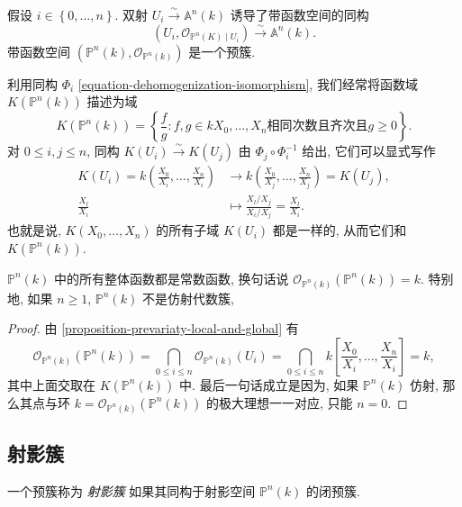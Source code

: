 \begin{corollary}
  假设 \( i \in \left\lbrace 0, \ldots, n \right\rbrace \). 双射 \( U_i
  \xrightarrow{\sim} \mathbb{A}^n(k) \) 诱导了带函数空间的同构
  \[
    (U_i, \mathscr{O}_{\mathbb{P}^n(K) \mid U_i}) \xrightarrow{\sim}
    \mathbb{A}^n(k).
  \]
  带函数空间 \( (\mathbb{P}^n(k), \mathscr{O}_{\mathbb{P}^n(k)}) \) 是一个预簇.
\end{corollary}

利用同构 \( \Phi_i \) \eqref{equation-dehomogenization-isomorphism},
我们经常将函数域 \( K(\mathbb{P}^n(k)) \) 描述为域
\[
  K(\mathbb{P}^n(k)) = \left\lbrace \frac{f}{g}: f,g \in k{X_0, \ldots, X_n}
  \text{相同次数且齐次且} g\geq 0 \right\rbrace.
\]
对 \( 0 \leq i, j \leq n \), 同构 \( K(U_i) \xrightarrow{\sim} K(U_j) \) 由 \(
\Phi_j \circ \Phi_i^{-1} \) 给出, 它们可以显式写作
\begin{align*}
  K(U_i) = k \left( \frac{X_0}{X_i},\ldots,\frac{X_n}{X_i} \right) &\to k \left(
  \frac{X_0}{X_j}, \ldots, \frac{X_n}{X_j} \right) = K(U_j),\\
    \frac{X_l}{X_i} &\mapsto \frac{X_l / X_j}{X_i / X_j} = \frac{X_l}{X_i}.
\end{align*}
也就是说, \( K(X_0, \ldots, X_n) \) 的所有子域 \( K(U_i) \) 都是一样的,
从而它们和 \( K(\mathbb{P}^n(k)) \).

\begin{proposition}
  \( \mathbb{P}^n(k) \) 中的所有整体函数都是常数函数, 换句话说 \(
  \mathscr{O}_{\mathbb{P}^n(k)}(\mathbb{P}^n(k)) = k \). 特别地, 如果 \( n \geq
  1 \), \( \mathbb{P}^n(k) \) 不是仿射代数簇, 
\end{proposition}
\begin{proof}
  由 \cref{proposition-prevariaty-local-and-global} 有
  \[
    \mathscr{O}_{\mathbb{P}^n(k)} (\mathbb{P}^n(k)) = \bigcap_{0 \leq i \leq n}
    \mathscr{O}_{\mathbb{P}^n(k)} (U_i) = \bigcap_{0 \leq i \leq n} k
    \left[\frac{X_0}{X_i}, \ldots, \frac{X_n}{X_i}\right] = k,
  \]
  其中上面交取在 \( K(\mathbb{P}^n(k)) \) 中. 最后一句话成立是因为, 如果 \(
  \mathbb{P}^n(k) \) 仿射, 那么其点与环 \( k =
  \mathcal{O}_{\mathbb{P}^n(k)}(\mathbb{P}^n(k)) \) 的极大理想一一对应, 只能 \(
  n = 0 \).
\end{proof}

\subsection{射影簇}

一个预簇称为 \emph{射影簇} 如果其同构于射影空间 \( \mathbb{P}^n(k) \) 的闭预簇.

